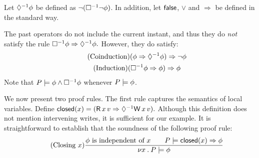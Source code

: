 Let $\Diamond^{-1}\phi$ be defined as $\lnot(\Box^{-1}\lnot\phi)$. 
In addition, let $\mathsf{false}$, $\lor$ and $\Rightarrow$ be defined in the
standard way.

The past operators do not include the current instant, and thus 
they do \emph{not} satisfy the rule
\begin{math}
  \Box^{-1}\phi\Rightarrow\Diamond^{-1}\phi.
\end{math}
However, they do satisfy:
\begin{gather*}
  \tag{Coinduction}
  (\phi \Rightarrow\Diamond^{-1}{\phi}) \Rightarrow\lnot \phi
  \\
  \tag{Induction}
  (\Box^{-1}\phi \Rightarrow\phi) \Rightarrow\phi
\end{gather*}
Note that $P \models \phi \land \Box^{-1}\phi$ whenever $P \models \phi$.

We now present two proof rules.  The first rule captures the semantics of
local variables.  Define
\begin{math}
  \closed(\aLoc) = (\DR{\aLoc}{\aVal} \Rightarrow \once \DW{\aLoc}{\aVal}).
\end{math}
Although this definition does not mention intervening writes, it is
sufficient for our example.  It is straightforward to establish that the
soundness of the following proof rule:
\begin{displaymath}
  \tag{Closing $\aLoc$}
  \frac{
    \afo \text{ is independent of } \aLoc
    \qquad
    \aPS \models \closed(\aLoc) \Rightarrow \afo
  }{
    \nu \aLoc \st \aPS \models \afo
  }
\end{displaymath}

